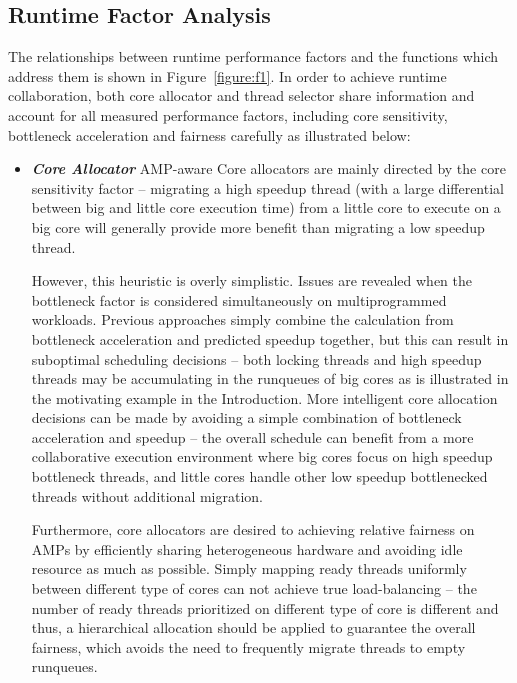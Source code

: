 \documentclass{sig-alternate}
\begin{document}
\subsection{Runtime Factor Analysis}
The relationships between runtime performance factors and the functions which address them is shown in Figure~\ref{figure:f1}. In order to achieve runtime collaboration, both core allocator and thread selector share information and account for all measured performance factors, including core sensitivity, bottleneck acceleration and fairness carefully as illustrated below:
\begin{itemize}
\item \textbf{\textit{Core Allocator}} AMP-aware Core allocators are mainly directed by the core sensitivity factor -- migrating a high speedup thread (with a large differential between big and little core execution time) from  a little core to execute on a big core will generally provide more benefit than migrating a low speedup thread. 

However, this heuristic is overly simplistic. Issues are revealed when the bottleneck factor is considered simultaneously on multiprogrammed workloads. Previous approaches \cite{jibaja2016portable} simply combine the calculation from  bottleneck acceleration and predicted speedup together, but this can result in suboptimal scheduling decisions -- both locking threads and high speedup threads may be accumulating in the runqueues of big cores as is illustrated in the motivating example in the Introduction. More intelligent core allocation decisions can be made by avoiding a simple combination of bottleneck acceleration and speedup -- the overall schedule can benefit from a more collaborative execution environment where big cores focus on high speedup bottleneck threads, and little cores handle other low speedup bottlenecked threads without additional migration.

Furthermore, core allocators are desired to achieving relative fairness on AMPs by efficiently sharing heterogeneous hardware and avoiding idle resource as much as possible. 
Simply mapping ready threads uniformly between different type of cores can not achieve true load-balancing -- the number of ready threads prioritized on different type of core is different and thus, a hierarchical allocation should be applied to guarantee the overall fairness, which avoids the need to frequently migrate threads to empty runqueues. 



\end{itemize}
\end{document}
